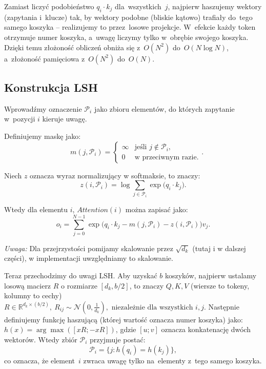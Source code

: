 \documentclass[a4paper,11pt,twoside]{report}
\theoremstyle{definition}
\begin{document}
Zamiast liczyć podobieństwo $q_i \cdot k_j$ dla~wszystkich~$j$, najpierw haszujemy wektory (zapytania i~klucze) tak, by wektory podobne (bliskie kątowo) trafiały do~tego samego koszyka -- realizujemy to przez~losowe projekcje. W~efekcie każdy token otrzymuje numer koszyka, a~uwagę liczymy tylko w~obrębie swojego koszyka. Dzięki temu złożoność obliczeń obniża się z~$O(N^2)$ do~$O(N \log N)$, 
a~złożoność pamięciowa z~$O(N^2)$ do~$O(N)$.



\subsection{Konstrukcja LSH}
Wprowadźmy oznaczenie $\mathcal{P}_i$ jako zbioru elementów, do których zapytanie w~pozycji $i$ kieruje uwagę. 

Definiujemy maskę jako: 
\begin{equation}
\quad
m(j, \mathcal{P}_i) =
\begin{cases}
\infty & \text{jeśli } j \notin \mathcal{P}_i, \\
0 & \text{w~przeciwnym razie.}
\end{cases}
.
\end{equation}

Niech $z$ oznacza wyraz normalizujący w softmaksie, to znaczy:
\begin{equation}
z(i, \mathcal{P}_i) = \log \sum_{j \in \mathcal{P}_i} \exp\Big(q_i \cdot k_j\Big)
.
\end{equation}

Wtedy dla elementu $i$, $Attention(i)$ można zapisać jako:
\begin{equation}
o_i = \sum_{j=0}^{N-1} \exp\Big(q_i \cdot k_j - m(j, \mathcal{P}_i) - z(i, \mathcal{P}_i)\Big) v_j
.
\end{equation}

\textit{Uwaga:} Dla przejrzystości pomijamy skalowanie przez $\sqrt{d_k}$ (tutaj i w dalszej części), w implementacji uwzględniamy to skalowanie.

Teraz przechodzimy do uwagi LSH. Aby uzyskać $b$ koszyków, najpierw ustalamy losową macierz $R$ o rozmiarze $[d_k, b/2]$, to znaczy 
$Q, K, V$ (wiersze to tokeny, kolumny to cechy)
$
R \in \mathbb{R}^{d_k \times (b/2)}, \
R_{ij} \sim \mathcal{N}\!\left(0, \frac{1}{d_k}\right),
\text{ niezależnie dla~wszystkich } i,j.$ Następnie definiujemy funkcję haszującą (której wartość oznacza numer koszyka) jako: $h(x) = \arg\max([xR; -xR])$, gdzie $[u; v]$ oznacza konkatenację dwóch wektorów. Wtedy zbiór $\mathcal{P}_i$ przyjmuje postać:
\begin{equation}
\mathcal{P}_i = \Big\{j : h(q_i) = h(k_j) \Big\}
,
\end{equation}
co oznacza, że element~$i$ zwraca uwagę tylko na~elementy z~tego samego koszyka.
\end{document}

